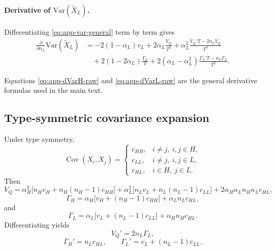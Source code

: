 \documentclass[a4paper,12pt]{article}
\theoremstyle{definition}
\theoremstyle{remark}
\DeclareMathOperator{\Cov}{Cov}
\newcommand{\Var}{\mathrm{Var}}
\newcommand{\1}{\mathbf{1}}
\begin{document}
\paragraph{Derivative of \(\Var(\tilde X_L)\).}
Differentiating \eqref{eq:app-var-general} term by term gives
\begin{equation}
\begin{aligned}
\frac{\partial}{\partial \alpha_L}\Var(\tilde X_L)
&=
-2(1-\alpha_L)v_L
+2\alpha_L\frac{V_Q}{T^2}
+\alpha_L^2\frac{V_Q'T-2n_LV_Q}{T^3} \\
&\quad
+2(1-2\alpha_L)\frac{\Gamma_L}{T}
+2(\alpha_L-\alpha_L^2)\frac{\Gamma_L'T-n_L\Gamma_L}{T^2}.
\end{aligned}
\label{eq:app-dVarL-raw}
\end{equation}

Equations \eqref{eq:app-dVarH-raw} and \eqref{eq:app-dVarL-raw} are the general
derivative formulas used in the main text.

\subsection{Type-symmetric covariance expansion}
\label{app:alphaL-typesym}

Under type symmetry,
\[
\Cov(X_i,X_j)=
\begin{cases}
c_{HH}, & i\neq j,\ i,j\in H,\\
c_{LL}, & i\neq j,\ i,j\in L,\\
c_{HL}, & i\in H,\ j\in L.
\end{cases}
\]
Then
\begin{equation}
V_Q
=
\alpha_H^2\bigl[n_Hv_H+n_H(n_H-1)c_{HH}\bigr]
+
\alpha_L^2\bigl[n_Lv_L+n_L(n_L-1)c_{LL}\bigr]
+
2\alpha_H\alpha_Ln_Hn_Lc_{HL},
\label{eq:app-VQ-typesym}
\end{equation}
\begin{equation}
\Gamma_H
=
\alpha_H\bigl[v_H+(n_H-1)c_{HH}\bigr]
+
\alpha_Ln_Lc_{HL},
\label{eq:app-GammaH-typesym}
\end{equation}
and
\begin{equation}
\Gamma_L
=
\alpha_L\bigl[v_L+(n_L-1)c_{LL}\bigr]
+
\alpha_Hn_Hc_{HL}.
\label{eq:app-GammaL-typesym}
\end{equation}
Differentiating yields
\begin{equation}
V_Q'=2n_L\Gamma_L,
\label{eq:app-VQprime-typesym}
\end{equation}
\begin{equation}
\Gamma_H'=n_Lc_{HL},
\qquad
\Gamma_L'=v_L+(n_L-1)c_{LL}.
\label{eq:app-Gammaprime-typesym}
\end{equation}
\end{document}
